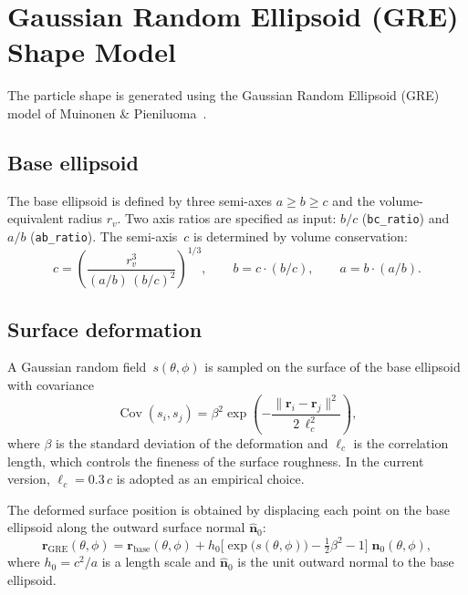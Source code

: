 \documentclass[11pt,a4paper]{article}
\begin{document}
\section{Gaussian Random Ellipsoid (GRE) Shape Model}
\label{sec:gre}

The particle shape is generated using the Gaussian Random Ellipsoid
(GRE) model of Muinonen \& Pieniluoma~\cite{Muinonen2011}.

\subsection{Base ellipsoid}
\label{sec:base-ellipsoid}

The base ellipsoid is defined by three semi-axes $a \ge b \ge c$ and
the volume-equivalent radius $r_v$.
Two axis ratios are specified as input: $b/c$ (\texttt{bc\_ratio}) and
$a/b$ (\texttt{ab\_ratio}).
The semi-axis~$c$ is determined by volume conservation:
\begin{equation}
  c = \left(\frac{r_v^3}{(a/b)\,(b/c)^2}\right)^{\!1/3},
  \qquad
  b = c \cdot (b/c),
  \qquad
  a = b \cdot (a/b).
  \label{eq:semi-axes}
\end{equation}

\subsection{Surface deformation}
\label{sec:gre-deformation}

A Gaussian random field~$s(\theta, \phi)$ is sampled on the surface of
the base ellipsoid with covariance
\begin{equation}
  \operatorname{Cov}(s_i, s_j)
    = \beta^2 \exp\!\left(
        -\frac{\|\bm{r}_i - \bm{r}_j\|^2}{2\,\ell_c^2}
      \right),
  \label{eq:gre-covariance}
\end{equation}
where $\beta$ is the standard deviation of the deformation and
$\ell_c$ is the correlation length, which controls the fineness of
the surface roughness.
In the current version, $\ell_c = 0.3\,c$ is adopted as an
empirical choice.

The deformed surface position is obtained by displacing each point
on the base ellipsoid along the outward surface normal
$\hat{\bm{n}}_0$:
\begin{equation}
  \bm{r}_{\text{GRE}}(\theta, \phi)
    = \bm{r}_{\text{base}}(\theta, \phi)
      + h_0 \bigl[\exp\!\bigl(s(\theta,\phi)\bigr)
        - \tfrac{1}{2}\beta^2 - 1\bigr]\;
      \hat{\bm{n}}_0(\theta, \phi),
  \label{eq:gre-deformation}
\end{equation}
where $h_0 = c^2 / a$ is a length scale and $\hat{\bm{n}}_0$ is the
unit outward normal to the base ellipsoid.
\end{document}
